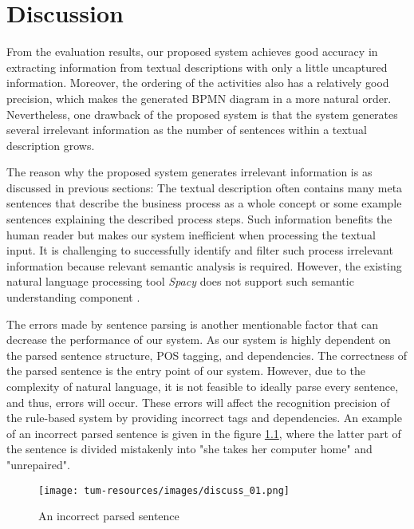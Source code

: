\chapter{Discussion}
\label{sec:discussion}

From the evaluation results, our proposed system achieves good accuracy in extracting information from textual descriptions with only a little uncaptured information. Moreover, the ordering of the activities also has a relatively good precision, which makes the generated BPMN diagram in a more natural order. Nevertheless, one drawback of the proposed system is that the system generates several irrelevant information as the number of sentences within a textual description grows.

The reason why the proposed system generates irrelevant information is as discussed in previous sections: The textual description often contains many meta sentences that describe the business process as a whole concept or some example sentences explaining the described process steps. Such information benefits the human reader but makes our system inefficient when processing the textual input. It is challenging to successfully identify and filter such process irrelevant information because relevant semantic analysis is required. However, the existing natural language processing tool \textit{Spacy} does not support such semantic understanding component \cite{t2m_1_successor}.

The errors made by sentence parsing is another mentionable factor that can decrease the performance of our system. As our system is highly dependent on the parsed sentence structure, POS tagging, and dependencies. The correctness of the parsed sentence is the entry point of our system. However, due to the complexity of natural language, it is not feasible to ideally parse every sentence, and thus, errors will occur. These errors will affect the recognition precision of the rule-based system by providing incorrect tags and dependencies. An example of an incorrect parsed sentence is given in the figure \ref{img:incorrect_pasrsing}, where the latter part of the sentence is divided mistakenly into "she takes her computer home" and "unrepaired". 

\begin{figure}[h]
    \centering
    \caption{An incorrect parsed sentence}
    \label{img:incorrect_pasrsing}
    \texttt{[image: tum-resources/images/discuss\_01.png]}
\end{figure}

